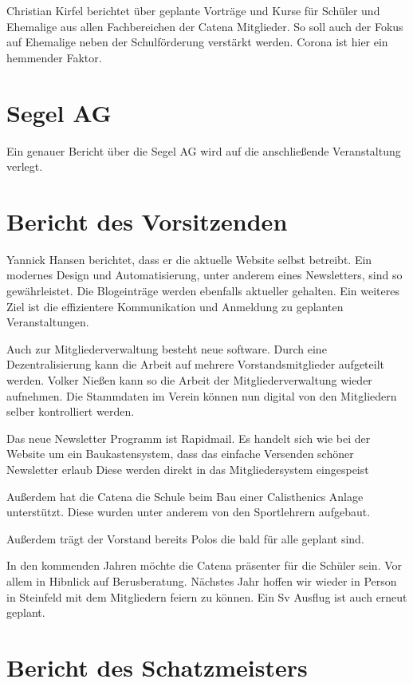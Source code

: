 \documentclass[a4paper, 11pt]{article}
\begin{document}
Christian Kirfel berichtet über geplante Vorträge und Kurse für Schüler und Ehemalige aus allen Fachbereichen der Catena Mitglieder.
So soll auch der Fokus auf Ehemalige neben der Schulförderung verstärkt werden. 
Corona ist hier ein hemmender Faktor.

\section*{Segel AG}

Ein genauer Bericht über die Segel AG wird auf die anschließende Veranstaltung verlegt.

\section*{Bericht des Vorsitzenden}


Yannick Hansen berichtet, dass er die aktuelle Website selbst betreibt.
Ein modernes Design und Automatisierung, unter anderem eines Newsletters, sind so gewährleistet.
Die Blogeinträge werden ebenfalls aktueller gehalten.
Ein weiteres Ziel ist die effizientere Kommunikation und Anmeldung zu geplanten Veranstaltungen.

Auch zur Mitgliederverwaltung besteht neue software. Durch eine Dezentralisierung kann die Arbeit auf mehrere Vorstandsmitglieder aufgeteilt werden.
Volker Nießen kann so die Arbeit der Mitgliederverwaltung wieder aufnehmen.
Die Stammdaten im Verein können nun digital von den Mitgliedern selber kontrolliert werden.

Das neue Newsletter Programm ist Rapidmail. Es handelt sich wie bei der Website um ein Baukastensystem, dass das einfache Versenden schöner Newsletter erlaub
Diese werden direkt in das Mitgliedersystem eingespeist

Außerdem hat die Catena die Schule beim Bau einer Calisthenics Anlage unterstützt.
Diese wurden unter anderem von den Sportlehrern aufgebaut.

Außerdem trägt der Vorstand bereits Polos die bald für alle geplant sind.

In den kommenden Jahren möchte die Catena präsenter für die Schüler sein. Vor allem in Hibnlick auf Berusberatung.
Nächstes Jahr hoffen wir wieder in Person in Steinfeld mit dem Mitgliedern feiern zu können.
Ein Sv Ausflug ist auch erneut geplant.




\section*{Bericht des Schatzmeisters}
\end{document}
